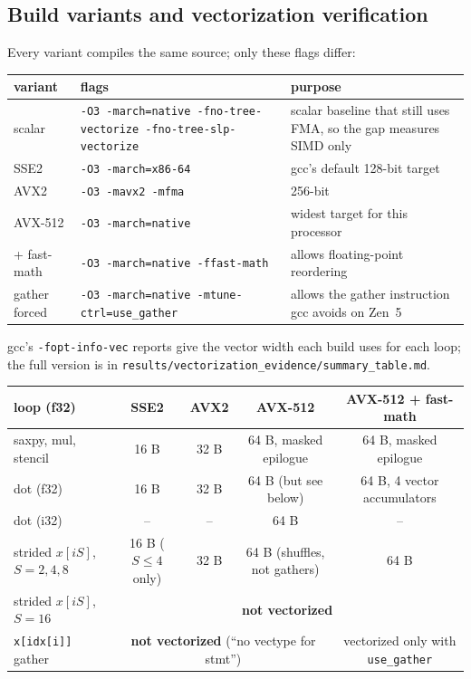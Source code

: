 \documentclass{article}
\begin{document}
\subsection{Build variants and vectorization verification}\label{sec:verify}
Every variant compiles the same source; only these flags differ:
\begin{center}\small
\begin{tabular}{lp{6.0cm}p{6.6cm}}
\toprule
variant & flags & purpose \\
\midrule
scalar & \texttt{-O3 -march=native -fno-tree-vectorize -fno-tree-slp-vectorize} & scalar baseline that still uses FMA, so the gap measures SIMD only \\
SSE2 & \texttt{-O3 -march=x86-64} & gcc's default 128-bit target \\
AVX2 & \texttt{-O3 -mavx2 -mfma} & 256-bit \\
AVX-512 & \texttt{-O3 -march=native} & widest target for this processor \\
+ fast-math & \texttt{-O3 -march=native -ffast-math} & allows floating-point reordering \cite{gccdoc} \\
gather forced & \texttt{-O3 -march=native -mtune-ctrl=use\_gather} & allows the gather instruction gcc avoids on Zen~5 \\
\bottomrule
\end{tabular}
\end{center}
gcc's \texttt{-fopt-info-vec} reports give the vector width each build uses for each loop; the full version is in \nolinkurl{results/vectorization_evidence/summary_table.md}.
\begin{center}\footnotesize
\begin{tabular}{lcccc}
\toprule
loop (f32) & SSE2 & AVX2 & AVX-512 & AVX-512 + fast-math \\
\midrule
saxpy, mul, stencil & 16 B & 32 B & 64 B, masked epilogue & 64 B, masked epilogue \\
dot (f32) & 16 B & 32 B & 64 B (but see below) & 64 B, 4 vector accumulators \\
dot (i32) & -- & -- & 64 B & -- \\
strided $x[iS]$, $S=2,4,8$ & 16 B ($S\le4$ only) & 32 B & 64 B (shuffles, not gathers) & 64 B \\
strided $x[iS]$, $S=16$ & \multicolumn{4}{c}{\textbf{not vectorized}} \\
\texttt{x[idx[i]]} gather & \multicolumn{3}{c}{\textbf{not vectorized} (``no vectype for stmt'')} & vectorized only with \texttt{use\_gather} \\
\bottomrule
\end{tabular}
\end{center}
\end{document}
